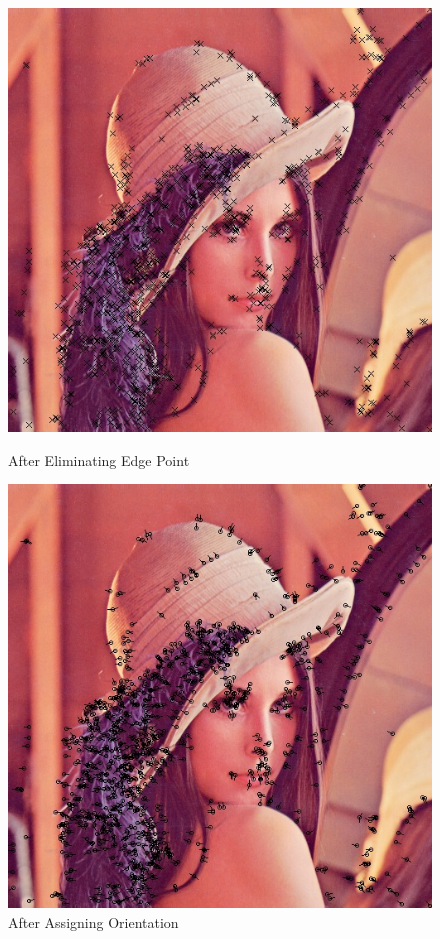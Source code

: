 \begin{enumerate}
    \begin{figure}
      \begin{minipage}[b]{0.46\linewidth}
        \centering
        \includegraphics[scale=0.4]{res/feature_point.png}
        \caption{After Eliminating Edge Point\label{fig:feature3}}
      \end{minipage}
      \hspace{1em}
      \begin{minipage}[b]{0.46\linewidth}
        \centering
        \includegraphics[scale=0.4]{res/feature_dir.png}
        \caption{After Assigning Orientation\label{fig:feature4}}
      \end{minipage}
    \end{figure}


\end{enumerate}

